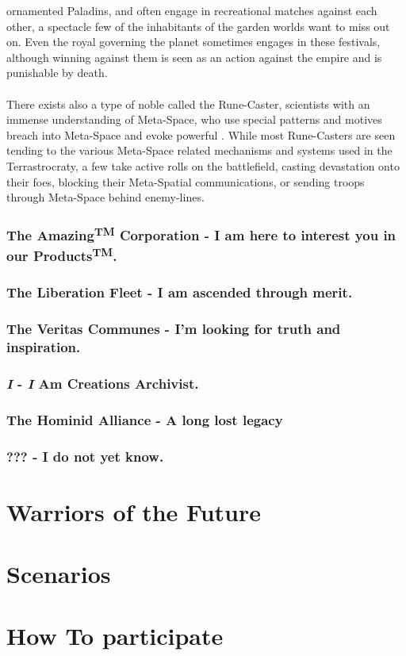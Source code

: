 \documentclass[a4paper,12pt]{report}
\begin{document}
ornamented Paladins, and often engage in recreational matches against each other, a spectacle few of the inhabitants of the garden worlds want to miss out on. Even the royal governing the planet sometimes engages in these festivals, although winning against them is seen as an action against the empire and is punishable by death.\\
\\
There exists also a type of noble called the Rune-Caster, scientists with an immense understanding of Meta-Space, who use special patterns and motives breach into Meta-Space and evoke powerful . While most Rune-Casters are seen tending to the various Meta-Space related mechanisms and systems used in the Terrastrocraty, a few take active rolls on the battlefield, casting devastation onto their foes, blocking their Meta-Spatial communications, or sending troops through Meta-Space behind enemy-lines.

\pagebreak


\subsection{The Amazing\textsuperscript{TM} Corporation - I am here to interest you in our Products\textsuperscript{TM}.}

\subsection{The Liberation Fleet - I am ascended through merit.}

\subsection{The  Veritas Communes - I'm looking for truth and inspiration. }

\subsection{\textit{I} - \textit{I} Am Creations Archivist.}

\subsection{The Hominid Alliance - A long lost legacy}

\subsection{??? - I do not yet know.}

\chapter{Warriors of the Future}

\chapter{Scenarios}

\chapter{How To participate}
\end{document}
